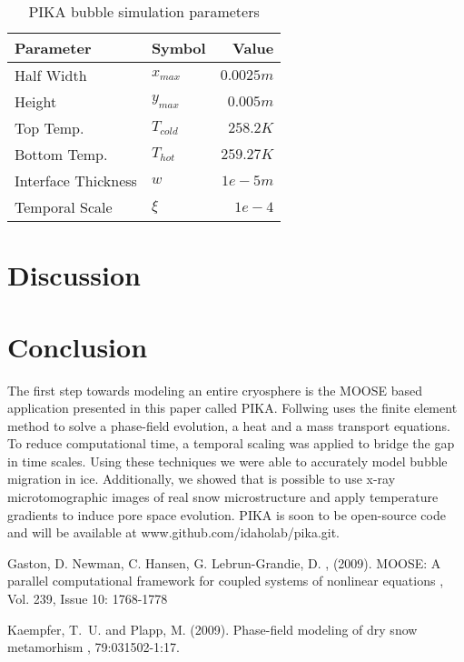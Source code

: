 \documentclass[twoside]{article}
\begin{document}
\begin{multicols}{2}
\begin{table}[H] 
\caption{PIKA bubble simulation parameters}
\label{table:bubble_stats}
\centering
\begin{tabular}{llr}
\toprule
Parameter & Symbol & Value \\
\midrule
Half Width & $x_{max}$ & $0.0025 m$ \\
Height & $y_{max}$ & $0.005 m$ \\
Top Temp. & $T_{cold}$ & $258.2 K$ \\
Bottom Temp. & $T_{hot}$ & $259.27 K$ \\
Interface Thickness & $w$ & $1e-5 m$ \\
Temporal Scale & $\xi$ & $1e-4$ \\
\bottomrule
\end{tabular}
\end{table}


\section{Discussion}

\section{Conclusion}
The first step towards modeling an entire cryosphere is the MOOSE based application presented in this paper called PIKA. Follwing \cite{Plapp_2009} uses the finite element method to solve a phase-field evolution, a heat and a mass transport equations. To reduce computational time, a temporal scaling was applied to bridge the gap in time scales. Using these techniques we were able to accurately model bubble migration in ice. 
Additionally, we showed that is possible to use x-ray microtomographic images of real snow microstructure and apply temperature gradients to induce pore space evolution. PIKA is soon to be open-source code and will be available at www.github.com/idaholab/pika.git.    


\begin{thebibliography}{50} %


Gaston, D.  Newman, C. Hansen, G. Lebrun-Grandie, D. , (2009).
\newblock MOOSE: A parallel computational framework for coupled systems of nonlinear equations
, Vol. 239, Issue 10: 1768-1778 

Kaempfer, T.~U. and Plapp, M. (2009).
\newblock Phase-field modeling of dry snow metamorhism
, 79:031502-1:17.

\end{thebibliography}


\end{multicols}
\end{document}
